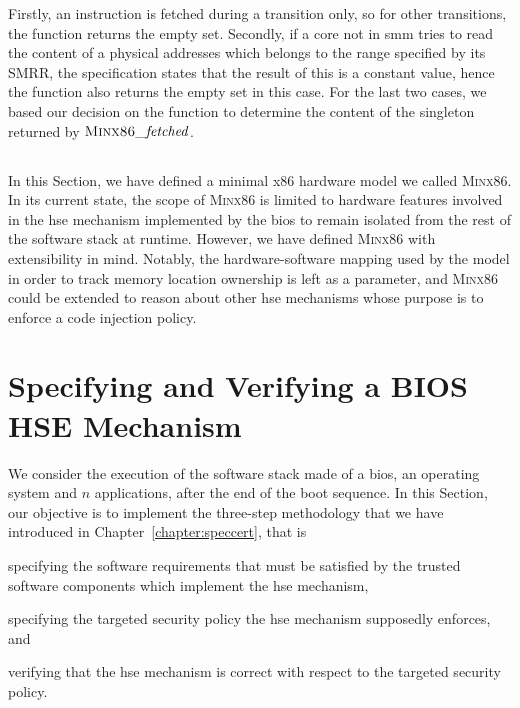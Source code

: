 %
%
Firstly, an instruction is fetched during a  transition only, so for
other transitions, the function returns the empty set.
%
Secondly, if a core not in \ac{smm} tries to read the content of a physical
addresses which belongs to the range specified by its SMRR, the specification
states that the result of this \IO is a constant value, hence the function
also returns the empty set in this case.
%
For the last two cases, we based our decision on the 
function to determine the content of the singleton returned by
\( \textsc{Minx86}\mathit{\_fetched} \).

\subsection*{}

In this Section, we have defined a minimal x86 hardware model we called
{\scshape Minx86}.
%
In its current state, the scope of {\scshape Minx86} is limited to hardware
features involved in the \ac{hse} mechanism implemented by the \ac{bios} to
remain isolated from the rest of the software stack at runtime.
%
However, we have defined {\scshape Minx86} with extensibility in mind.
%
Notably, the hardware-software mapping used by the model in order to track
memory location ownership is left as a parameter, and {\scshape Minx86} could be
extended to reason about other \ac{hse} mechanisms whose purpose is to enforce a
code injection policy.

\section{Specifying and Verifying a BIOS HSE Mechanism}
\label{sec:speccert2:verif}

We consider the execution of the software stack made of a \ac{bios}, an
operating system and \( n \) applications, after the end of the boot sequence.
%
In this Section, our objective is to implement the three-step methodology that
we have introduced in Chapter~\ref{chapter:speccert}, that is
%
\begin{inparaenum}[(1)]
\item specifying the software requirements that must be satisfied by the trusted
  software components which implement the \ac{hse} mechanism,
%
\item specifying the targeted security policy the \ac{hse} mechanism supposedly
  enforces, and
%
\item verifying that the \ac{hse} mechanism is correct with respect to the
  targeted security policy.
\end{inparaenum}

